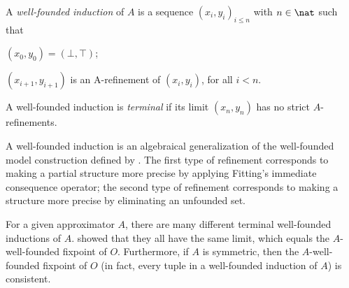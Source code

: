  \begin{definition}
 A \emph{well-founded induction} of $A$  is a sequence 
$(x_i,y_i)_{i\leq n}$
with $n\in\nat$ such that 
\begin{compactitem}
	\item $(x_0,y_0) = (\bot,\top)$;
	\item $(x_{i+1},y_{i+1})$ is an A-refinement of $(x_{i},y_{i})$, for  all $i<n$.
\end{compactitem}
A well-founded induction is \emph{terminal} if its limit $(x_n,y_n)$ has no strict $A$-refinements.
\end{definition}
A well-founded induction is an algebraical generalization of the well-founded model construction defined by \citet{GelderRS91}. 
The first type of refinement corresponds to making a partial structure more precise by applying Fitting's immediate consequence operator; the second type of refinement corresponds to making a structure more precise by eliminating an unfounded set. 

For a given approximator $A$, there are many different terminal well-founded inductions of $A$.
\citet{lpnmr/DeneckerV07}  showed that they all have the same limit, which equals the $A$-well-founded fixpoint of $O$. Furthermore, if $A$ is symmetric, then the $A$-well-founded fixpoint of $O$ (in fact, every tuple in a well-founded induction of $A$) is consistent. 

